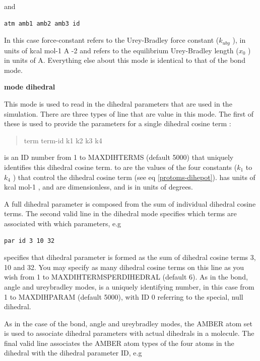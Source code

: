 \documentclass[letterpaper,10pt,english]{sphinxmanual}
\begin{document}
and

\begin{Verbatim}[commandchars=\\\{\}]
atm amb1 amb2 amb3 id
\end{Verbatim}

In this case force-constant refers to the Urey-Bradley force constant (\(k_{uby}\) ), in units of kcal mol-1 A -2 and  refers to the equilibrium Urey-Bradley length (\(x_0\) ) in units of A. Everything else about this mode is identical to that of the bond mode.

\textbf{mode dihedral}

This mode is used to read in the dihedral parameters that are used in the simulation. There are three types of line that are value in this mode. The first of these is used to provide the parameters for a single dihedral cosine term :
\begin{quote}

term term-id k1 k2 k3 k4
\end{quote}

 is an ID number from 1 to MAXDIHTERMS (default 5000) that uniquely identifies this dihedral cosine term.  to  are the values of the four constants (\(k_1\) to \(k_4\) ) that control the dihedral cosine term (see eq \eqref{protoms-dihepot}).  has units of kcal mol-1 ,  and  are dimensionless, and  is in units of degrees.

A full dihedral parameter is composed from the sum of individual dihedral cosine terms. The second valid line in the dihedral mode specifies which terms are associated with which parameters, e.g

\begin{Verbatim}[commandchars=\\\{\}]
par id 3 10 32
\end{Verbatim}

specifies that dihedral parameter  is formed as the sum of dihedral cosine terms 3, 10 and 32. You may specify as many dihedral cosine terms on this line as you wish from 1 to MAXDIHTERMSPERDIHEDRAL (default 6). As in the bond, angle and ureybradley modes,  is a uniquely identifying number, in this case from 1 to MAXDIHPARAM (default 5000), with ID 0 referring to the special, null dihedral.

As in the case of the bond, angle and ureybradley modes, the AMBER atom set is used to associate dihedral parameters with actual dihedrals in a molecule. The final valid line associates the AMBER atom types of the four  atoms in the dihedral with the dihedral parameter ID, e.g
\end{document}
